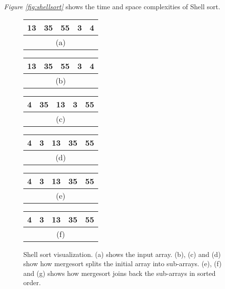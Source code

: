 \textit{Figure \ref{fig:shellsort}} shows the time and space complexities of Shell sort.

\begin{figure}[!ht]
    \centering
    \begin{tabular}{|c|c|c|c|c|}
    \hline
    13 & 35 & 55 & 3 & 4 \\
    \hline
    \multicolumn{5}{c}{(a)} \\
    \end{tabular}
    \quad\quad\quad
    \begin{tabular}{|c|c|c|c|c|}
    \hline
    \cellcolor{lightgray}13 & 35 & \cellcolor{lightgray}55 & 3 & \cellcolor{lightgray}4 \\
    \hline
    \multicolumn{5}{c}{(b)} \\
    \end{tabular}
    \break
    \begin{tabular}{|c|c|c|c|c|}
    \hline
    \cellcolor{lightgray}4 & 35 & \cellcolor{lightgray}13 & 3 & \cellcolor{lightgray}55 \\
    \hline
    \multicolumn{5}{c}{(c)} \\
    \end{tabular}
    \quad\quad\quad
    \begin{tabular}{|c|c|c|c|c|}
    \hline
    \cellcolor{lightgray}4 & 3 & \cellcolor{lightgray}13 & 35 & \cellcolor{lightgray}55 \\
    \hline
    \multicolumn{5}{c}{(d)} \\
    \end{tabular}
    \break
    \begin{tabular}{|c|c|c|c|c|}
    \hline
    \cellcolor{lightgray}4 & \cellcolor{lightgray}3 & \cellcolor{lightgray}13 & \cellcolor{lightgray}35 & \cellcolor{lightgray}55 \\
    \hline
    \multicolumn{5}{c}{(e)} \\
    \end{tabular}
    \quad\quad\quad
    \begin{tabular}{|c|c|c|c|c|}
    \hline
    \cellcolor{lightgray}4 & \cellcolor{lightgray}3 & \cellcolor{lightgray}13 & \cellcolor{lightgray}35 & \cellcolor{lightgray}55 \\
    \hline
    \multicolumn{5}{c}{(f)} \\
    \end{tabular}
    
    \caption{Shell sort visualization. (a) shows the input array. (b), (c) and (d) show how mergesort splits the initial array into sub-arrays. (e), (f) and (g) shows how mergesort joins back the sub-arrays in sorted order.}
    \label{fig:shellsort_ex}
\end{figure}

